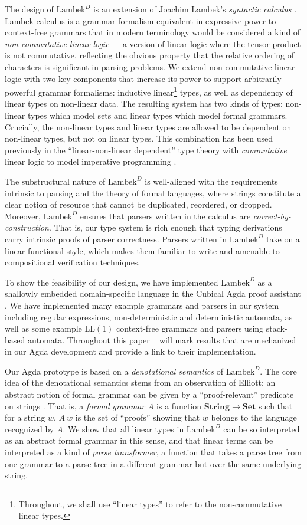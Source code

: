 \documentclass[acmsmall,nonacm]{acmart}
\newcommand{\StringSem}{\mathbf{String}}
\newcommand{\Set}{\mathbf{Set}}
\newcommand{\theoryabbv}{$\textrm{Lambek}^D$\xspace}
\newcommand{\LLL}{\textrm{LL}}
\newcommand{\LL}[1]{\LLL(#1)}
\newcommand{\agdalogo}{%
  \usebox{\logoagdabox}}%
\newcommand{\zenodolink}{https://zenodo.org/records/15049780}
\newcommand{\Agda}{\href{\zenodolink}{\agdalogo}}
\begin{document}
The design of \theoryabbv
is an extension of Joachim Lambek's \emph{syntactic calculus}
\cite{lambek58}. Lambek calculus is a grammar formalism equivalent
in expressive power to context-free grammars that in modern
terminology would be considered a kind of \emph{non-commutative linear
logic} --- a version of linear logic where the tensor product is not
commutative, reflecting the obvious property that the relative
ordering of characters is significant in parsing problems. We extend
non-commutative linear logic with two key components that increase its
power to support arbitrarily powerful grammar formalisms: inductive
linear\footnote{Throughout, we shall use ``linear types'' to refer to the
non-commutative linear types.} types, as well as dependency of linear types on non-linear
data. The resulting system has two kinds of types: non-linear types
which model sets and linear types which model formal
grammars. Crucially, the non-linear types and linear types are allowed
to be dependent on non-linear types, but not on linear types. This
combination has been used previously in the ``linear-non-linear
dependent'' type theory with \emph{commutative} linear logic to model
imperative programming \cite{krishnaswami_integrating_2015}.

The substructural nature of \theoryabbv is well-aligned with the
requirements intrinsic to parsing and the theory of formal
languages, where strings constitute a clear notion of resource
that cannot be duplicated, reordered, or dropped. Moreover, \theoryabbv ensures that parsers written in the calculus are \emph{correct-by-construction}. That is, our type system is rich
enough that typing derivations carry intrinsic proofs of parser correctness.
Parsers written in \theoryabbv take on a linear functional style, which makes
them familiar to write and amenable to compositional verification techniques.

To show the feasibility of our design, we have implemented \theoryabbv
as a shallowly embedded domain-specific language in the Cubical Agda
proof assistant \cite{VezzosiMortbergAbel2019}. We have implemented many example
grammars and parsers in our system including regular expressions,
non-deterministic and deterministic automata, as well as some example
$\LL{1}$ context-free grammars and parsers using stack-based
automata. Throughout this paper \Agda~ will mark
results that are mechanized in our Agda development and provide a link to their
implementation.

Our Agda prototype is based on a \emph{denotational semantics} of
\theoryabbv. The core idea of the denotational semantics stems from an observation of Elliott:
an abstract notion of formal grammar can be given by a ``proof-relevant'' predicate on strings \cite{elliottSymbolicAutomaticDifferentiation2021}. That is, a \emph{formal grammar} $A$ is a
function $\StringSem \to \Set$ such that for a string $w$, $A~w$ is the
set of ``proofs'' showing that $w$ belongs to the language recognized
by $A$. We show that all linear types in \theoryabbv can be so
interpreted as an abstract formal grammar in this sense, and that
linear terms can be interpreted as a kind of \emph{parse transformer}, a function that
takes a parse tree from one grammar to a parse tree in a different
grammar but over the same underlying string.
\end{document}
